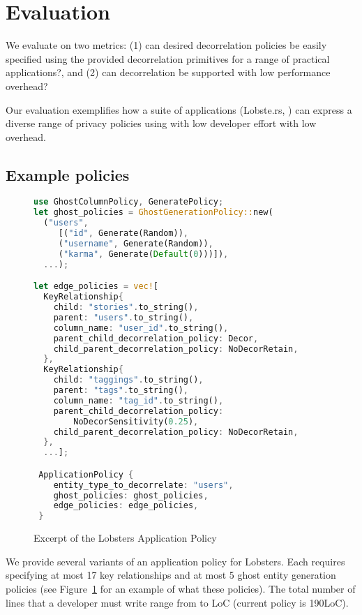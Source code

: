 \section{Evaluation}
We evaluate \sys{} on two metrics: (1) can desired decorrelation policies be easily specified using the
provided decorrelation primitives for a range of practical applications?, and (2) can decorrelation
be supported with low performance overhead?

Our evaluation exemplifies how a suite of applications (Lobste.rs, ) can express a diverse
range of privacy policies using \sys{} with low developer effort with low overhead.

\subsection{Example policies}
\begin{figure}
\begin{lstlisting}[language=Rust]
use GhostColumnPolicy, GeneratePolicy;
let ghost_policies = GhostGenerationPolicy::new(
  ("users", 
     [("id", Generate(Random)),
     ("username", Generate(Random)),
     ("karma", Generate(Default(0)))]),
  ...);

let edge_policies = vec![
  KeyRelationship{
    child: "stories".to_string(),
    parent: "users".to_string(),
    column_name: "user_id".to_string(),
    parent_child_decorrelation_policy: Decor,
    child_parent_decorrelation_policy: NoDecorRetain,
  },
  KeyRelationship{
    child: "taggings".to_string(),
    parent: "tags".to_string(),
    column_name: "tag_id".to_string(),
    parent_child_decorrelation_policy: 
        NoDecorSensitivity(0.25),
    child_parent_decorrelation_policy: NoDecorRetain,
  },
  ...];

 ApplicationPolicy {
    entity_type_to_decorrelate: "users",
    ghost_policies: ghost_policies,
    edge_policies: edge_policies,
 }
\end{lstlisting}
    \label{fig:policy}
    \caption{Excerpt of the Lobsters Application Policy}
\end{figure}
We provide several variants of an application policy for Lobsters. Each requires specifying at most 17 key
relationships and at most 5 ghost entity generation policies (see Figure~\ref{fig:policy} for an example
of what these policies). The total number of lines that a developer must write range from 
to  LoC (current policy is 190LoC).

